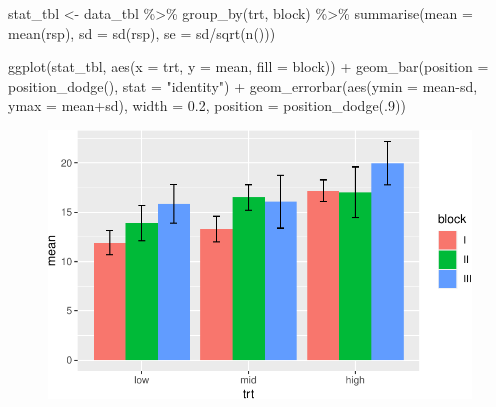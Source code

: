 \documentclass[
  letterpaper,
]{scrbook}
\newenvironment{Shaded}{\begin{snugshade}}{\end{snugshade}}
\newcommand{\AttributeTok}[1]{\textcolor[rgb]{0.40,0.45,0.13}{#1}}
\newcommand{\DecValTok}[1]{\textcolor[rgb]{0.68,0.00,0.00}{#1}}
\newcommand{\FloatTok}[1]{\textcolor[rgb]{0.68,0.00,0.00}{#1}}
\newcommand{\FunctionTok}[1]{\textcolor[rgb]{0.28,0.35,0.67}{#1}}
\newcommand{\NormalTok}[1]{\textcolor[rgb]{0.00,0.23,0.31}{#1}}
\newcommand{\OtherTok}[1]{\textcolor[rgb]{0.00,0.23,0.31}{#1}}
\newcommand{\SpecialCharTok}[1]{\textcolor[rgb]{0.37,0.37,0.37}{#1}}
\newcommand{\StringTok}[1]{\textcolor[rgb]{0.13,0.47,0.30}{#1}}
\begin{document}
\begin{Shaded}
\begin{Highlighting}[]
\NormalTok{stat\_tbl }\OtherTok{\textless{}{-}}\NormalTok{ data\_tbl }\SpecialCharTok{\%\textgreater{}\%} 
  \FunctionTok{group\_by}\NormalTok{(trt, block) }\SpecialCharTok{\%\textgreater{}\%} 
  \FunctionTok{summarise}\NormalTok{(}\AttributeTok{mean =} \FunctionTok{mean}\NormalTok{(rsp),}
            \AttributeTok{sd =} \FunctionTok{sd}\NormalTok{(rsp),}
            \AttributeTok{se =}\NormalTok{ sd}\SpecialCharTok{/}\FunctionTok{sqrt}\NormalTok{(}\FunctionTok{n}\NormalTok{()))}

\FunctionTok{ggplot}\NormalTok{(stat\_tbl, }\FunctionTok{aes}\NormalTok{(}\AttributeTok{x =}\NormalTok{ trt, }\AttributeTok{y =}\NormalTok{ mean, }\AttributeTok{fill =}\NormalTok{ block)) }\SpecialCharTok{+} 
    \FunctionTok{geom\_bar}\NormalTok{(}\AttributeTok{position =} \FunctionTok{position\_dodge}\NormalTok{(), }\AttributeTok{stat =} \StringTok{"identity"}\NormalTok{) }\SpecialCharTok{+}
    \FunctionTok{geom\_errorbar}\NormalTok{(}\FunctionTok{aes}\NormalTok{(}\AttributeTok{ymin =}\NormalTok{ mean}\SpecialCharTok{{-}}\NormalTok{sd, }\AttributeTok{ymax =}\NormalTok{ mean}\SpecialCharTok{+}\NormalTok{sd),}
                  \AttributeTok{width =} \FloatTok{0.2}\NormalTok{,}
                  \AttributeTok{position =} \FunctionTok{position\_dodge}\NormalTok{(.}\DecValTok{9}\NormalTok{))}
\end{Highlighting}
\end{Shaded}

\begin{figure}[H]

{\centering \includegraphics{./app-example-analysis_files/figure-pdf/unnamed-chunk-6-1.pdf}

}

\end{figure}
\end{document}
